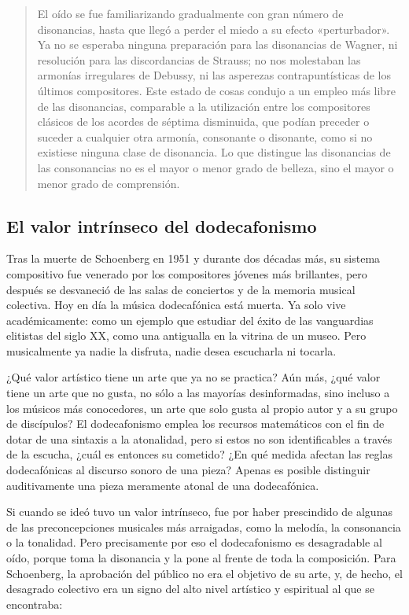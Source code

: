     \begin{quote}
    	El oído se fue familiarizando gradualmente con gran número de disonancias, hasta que llegó a perder el miedo a su efecto «perturbador». Ya no se esperaba ninguna preparación para las disonancias de Wagner, ni resolución para las discordancias de Strauss; no nos molestaban las armonías irregulares de Debussy, ni las asperezas contrapuntísticas de los últimos compositores. Este estado de cosas condujo a un empleo más libre de las disonancias, comparable a la utilización entre los compositores clásicos de los acordes de séptima disminuida, que podían preceder o suceder a cualquier otra armonía, consonante o disonante, como si no existiese ninguna clase de disonancia. Lo que distingue las disonancias de las consonancias no es el mayor o menor grado de belleza, sino el mayor o menor grado de comprensión.
    \end{quote}
        
     
	\subsection{El valor intrínseco del dodecafonismo}
	Tras la muerte de Schoenberg en 1951 y durante dos décadas más, su sistema compositivo fue venerado por los compositores jóvenes más brillantes, pero después se desvaneció de las salas de conciertos y de la memoria musical colectiva. Hoy en día la música dodecafónica está muerta. Ya solo vive académicamente: como un ejemplo que estudiar del éxito de las vanguardias elitistas del siglo XX, como una antigualla en la vitrina de un museo. Pero musicalmente ya nadie la disfruta, nadie desea escucharla ni tocarla.
	
	¿Qué valor artístico tiene un arte que ya no se practica? Aún más, ¿qué valor tiene un arte que no gusta, no sólo a las mayorías desinformadas, sino incluso a los músicos más conocedores, un arte que solo gusta al propio autor y a su grupo de discípulos? El dodecafonismo emplea los recursos matemáticos con el fin de dotar de una sintaxis a la atonalidad, pero si estos no son identificables a través de la escucha, ¿cuál es entonces su cometido? ¿En qué medida afectan las reglas dodecafónicas al discurso sonoro de una pieza? Apenas es posible distinguir auditivamente una pieza meramente atonal de una dodecafónica. \cite{basomba}
	
	Si cuando se ideó tuvo un valor intrínseco, fue por haber prescindido de algunas de las preconcepciones musicales más arraigadas, como la melodía, la consonancia o la tonalidad. Pero precisamente por eso el dodecafonismo es desagradable al oído, porque toma la disonancia y la pone al frente de toda la composición. Para Schoenberg, la aprobación del público no era el objetivo de su arte, y, de hecho, el desagrado colectivo era un signo del alto nivel artístico y espiritual al que se encontraba:
	
